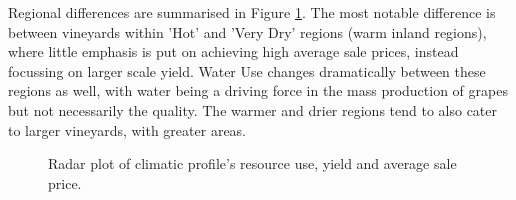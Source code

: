 \documentclass[review,12pt,authoryear]{elsarticle}
\begin{document}
\begin{linenumbers}
%
%
%
%
%
%
%
%
%

Regional differences are summarised in Figure \ref{fig:spider}. The most notable difference is between vineyards within 'Hot' and 'Very Dry' regions (warm inland regions), where little emphasis is put on achieving high average sale prices, instead focussing on larger scale yield. Water Use changes dramatically between these regions as well, with water being a driving force in the mass production of grapes but not necessarily the quality. The warmer and drier regions tend to also cater to larger vineyards, with greater areas.
\par
\begin{figure}
  \caption{Radar plot of climatic profile's resource use, yield and average sale price.}\label{fig:spider}
\end{figure}


\end{linenumbers}
\end{document}
